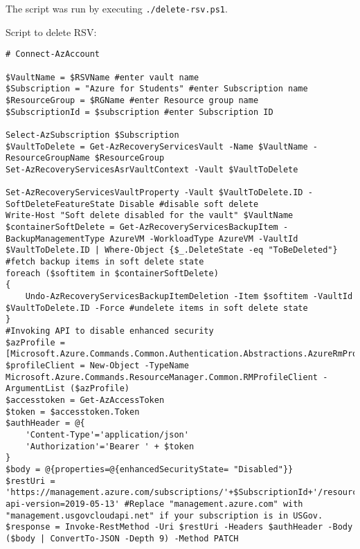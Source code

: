 The script was run by executing \texttt{./delete-rsv.ps1}.

Script to delete RSV:
\begin{verbatim}
# Connect-AzAccount

$VaultName = $RSVName #enter vault name
$Subscription = "Azure for Students" #enter Subscription name
$ResourceGroup = $RGName #enter Resource group name
$SubscriptionId = $subscription #enter Subscription ID

Select-AzSubscription $Subscription
$VaultToDelete = Get-AzRecoveryServicesVault -Name $VaultName -ResourceGroupName $ResourceGroup
Set-AzRecoveryServicesAsrVaultContext -Vault $VaultToDelete

Set-AzRecoveryServicesVaultProperty -Vault $VaultToDelete.ID -SoftDeleteFeatureState Disable #disable soft delete
Write-Host "Soft delete disabled for the vault" $VaultName
$containerSoftDelete = Get-AzRecoveryServicesBackupItem -BackupManagementType AzureVM -WorkloadType AzureVM -VaultId $VaultToDelete.ID | Where-Object {$_.DeleteState -eq "ToBeDeleted"} #fetch backup items in soft delete state
foreach ($softitem in $containerSoftDelete)
{
    Undo-AzRecoveryServicesBackupItemDeletion -Item $softitem -VaultId $VaultToDelete.ID -Force #undelete items in soft delete state
}
#Invoking API to disable enhanced security
$azProfile = [Microsoft.Azure.Commands.Common.Authentication.Abstractions.AzureRmProfileProvider]::Instance.Profile
$profileClient = New-Object -TypeName Microsoft.Azure.Commands.ResourceManager.Common.RMProfileClient -ArgumentList ($azProfile)
$accesstoken = Get-AzAccessToken
$token = $accesstoken.Token
$authHeader = @{
    'Content-Type'='application/json'
    'Authorization'='Bearer ' + $token
}
$body = @{properties=@{enhancedSecurityState= "Disabled"}}
$restUri = 'https://management.azure.com/subscriptions/'+$SubscriptionId+'/resourcegroups/'+$ResourceGroup+'/providers/Microsoft.RecoveryServices/vaults/'+$VaultName+'/backupconfig/vaultconfig?api-version=2019-05-13' #Replace "management.azure.com" with "management.usgovcloudapi.net" if your subscription is in USGov.
$response = Invoke-RestMethod -Uri $restUri -Headers $authHeader -Body ($body | ConvertTo-JSON -Depth 9) -Method PATCH



\end{verbatim}
